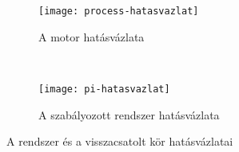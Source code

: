 \begin{figure}[H]
	\centering
	\begin{subfigure}[H]{\textwidth}
		\centering
		\texttt{[image: process-hatasvazlat]}
		\caption{A motor hatásvázlata}
		\label{fig:process-hatasvazlat}
	\end{subfigure}\\[15mm]
	
	\begin{subfigure}[H]{\textwidth}
		\centering
		\texttt{[image: pi-hatasvazlat]}
		\caption{A szabályozott rendszer hatásvázlata}
		\label{fig:pi-hatasvazlat}
	\end{subfigure}
	\caption{A rendszer és a visszacsatolt kör hatásvázlatai}
\end{figure}
